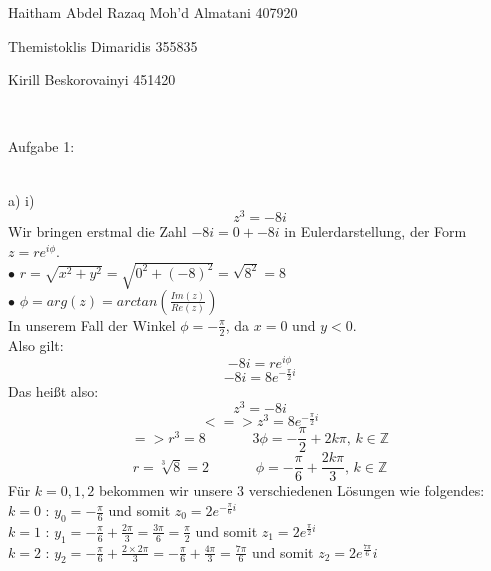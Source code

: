\documentclass[11pt]{article}
\begin{document}
	\noindent \begin{huge}Haitham Abdel Razaq Moh'd Almatani  407920
	
	\noindent Themistoklis Dimaridis 355835
	
	
	\noindent Kirill Beskorovainyi 	451420\end{huge}\\\vspace{0.05in}
	
		\noindent \begin{Large}Aufgabe 1:\end{Large}\\[2pt]
			\indent a) \hspace{20pt} i)\\
				$$z^3 = -8i$$
				Wir bringen erstmal die Zahl $-8i=0+-8i$ in Eulerdarstellung, der Form $z=re^{i\phi}$.\\
				$\bullet$  $r=\sqrt{x^2+y^2}=\sqrt{0^2+(-8)^2}=\sqrt{8^2}=8$\\
				$\bullet$  $\phi = arg(z) = arctan\left(\frac{Im(z)}{Re(z)}\right)$\\
				\indent \indent In unserem Fall der Winkel $\phi = -\frac{\pi}{2}$, da $x=0$ und $y<0$.\\
				Also gilt:\\
				$$-8i=re^{i\phi}$$
				$$-8i=8e^{-\frac{\pi}{2}i}$$
				Das heißt also:\\
				$$z^3=-8i$$
				$$<=>z^3=8e^{-\frac{\pi}{2}i}$$
				$$=> r^3 = 8 \hspace{40pt} 3\phi = -\frac{\pi}{2}+2k\pi \mbox{, } k\in \mathbb{Z}$$
				$$r=\sqrt[3]{8}=2 \hspace{40pt} \phi = -\frac{\pi}{6}+\frac{2k\pi}{3} \mbox{, } k\in \mathbb{Z}$$
				Für $k=0,1,2$ bekommen wir unsere $3$ verschiedenen Lösungen wie folgendes:\\
				\indent $k=0$ \hspace{10pt}: \hspace{10pt} $y_0=-\frac{\pi}{6}$ und somit $z_0=2e^{-\frac{\pi}{6}i}$\\
				\indent $k=1$ \hspace{10pt}: \hspace{10pt} $y_1=-\frac{\pi}{6} + \frac{2\pi}{3}=\frac{3\pi}{6}=\frac{\pi}{2}$ und somit $z_1=2e^{\frac{\pi}{2}i}$\\
				\indent $k=2$ \hspace{10pt}: \hspace{10pt} $y_2=-\frac{\pi}{6}+\frac{2\times 2 \pi}{3}=-\frac{\pi}{6}+\frac{4\pi}{3}=\frac{7\pi}{6}$ und somit $z_2=2e^\frac{7\pi}{6}i$\\
\end{document}
